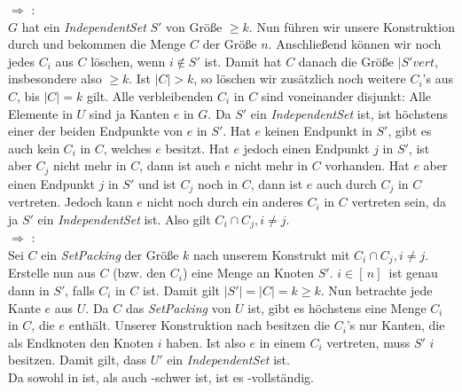 \documentclass[a4paper,11pt]{scrartcl}
\begin{document}
	 $\Rightarrow$ :\\
	$G$ hat ein \textit{IndependentSet} $S'$ von Größe $\geq k$. Nun führen wir unsere Konstruktion durch und bekommen die Menge $C$ der Größe $n$. Anschließend können wir noch jedes $C_i$ aus $C$ löschen, wenn $i \not\in S'$ ist. Damit hat $C$ danach die Größe $\vert S' vert$, insbesondere also $\geq k$. Ist $\vert C \vert > k$, so löschen wir zusätzlich noch weitere $C_i$'s aus $C$, bis $\vert C \vert = k$ gilt. Alle verbleibenden $C_i$ in $C$ sind voneinander disjunkt: Alle Elemente in $U$ sind ja Kanten $e$ in $G$. Da $S'$ ein \textit{IndependentSet} ist, ist höchstens einer der beiden Endpunkte von $e$ in $S'$. Hat $e$ keinen Endpunkt in $S'$, gibt es auch kein $C_i$ in $C$, welches $e$ besitzt. Hat $e$ jedoch einen Endpunkt $j$ in $S'$, ist aber $C_j$ nicht mehr in $C$, dann ist auch $e$ nicht mehr in $C$ vorhanden. Hat $e$ aber einen Endpunkt $j$ in $S'$ und ist $C_j$ noch in $C$, dann ist $e$ auch durch $C_j$ in $C$ vertreten. Jedoch kann $e$ nicht noch durch ein anderes $C_i$ in $C$ vertreten sein, da ja $S'$ ein \textit{IndependentSet} ist. Also gilt $C_i \cap C_j, i \neq j$.\\
	
	 $\Rightarrow$ :\\
	Sei $C$ ein \textit{SetPacking} der Größe $k$ nach unserem Konstrukt mit $C_i \cap C_j, i \neq j$. Erstelle nun aus $C$ (bzw. den $C_i$) eine Menge an Knoten $S'$. $i \in [\, n ]\,$ ist genau dann in $S'$, falls $C_i$ in $C$ ist. Damit gilt $\vert S' \vert = \vert C \vert = k \geq k$. Nun betrachte jede Kante $e$ aus $U$. Da $C$ das \textit{SetPacking} von $U$ ist, gibt es höchstens eine Menge $C_i$ in $C$, die $e$ enthält. Unserer Konstruktion nach besitzen die $C_i$'s nur Kanten, die als Endknoten den Knoten $i$ haben. Ist also $e$ in einem $C_i$ vertreten, muss $S'$ $i$ besitzen. Damit gilt, dass $U'$ ein \textit{IndependentSet} ist.\\
	
	Da  sowohl in  ist, als auch -schwer ist, ist es -vollständig.
	
\end{document}
